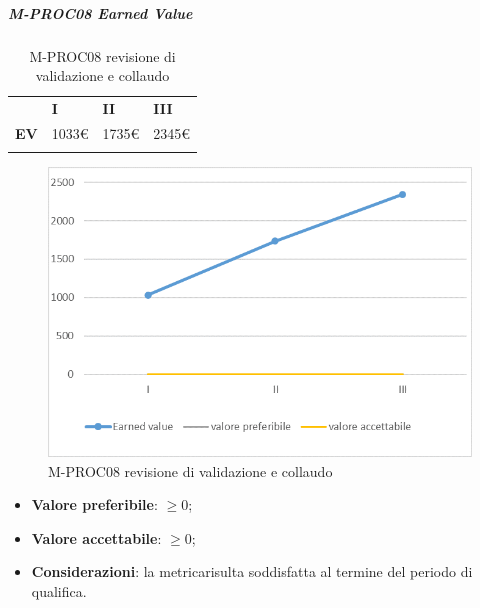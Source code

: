 \subparagraph{M-PROC08 Earned Value} \mbox{}
\begin{longtable}[H!] {						
		>{}p{35mm}  		
		>{}p{12mm}
		>{}p{12mm}		
		>{}p{12mm}		
	}
	\rowcolor{gray!50}
	\textbf{} & \textbf{I} & \textbf{II} & \textbf{III} \TBstrut \\ [2mm]
	\textbf{EV} & 1033\euro & 1735\euro & 2345\euro  \TBstrut \\ [2mm]
	\rowcolor{white}
	\caption{M-PROC08 revisione di validazione e collaudo}
\end{longtable}
\begin{figure}[H] 	
	\includegraphics[width=\linewidth]{./img/grafici/RA8.png}	
	\caption{M-PROC08 revisione di validazione e collaudo}	
\end{figure}
\begin{itemize}
	\item \textbf{Valore preferibile}: $\ge0$;
	\item \textbf{Valore accettabile}: $\ge0$;
	\item \textbf{Considerazioni}: la metrica\glosp risulta soddisfatta al termine del periodo di qualifica.
\end{itemize}

